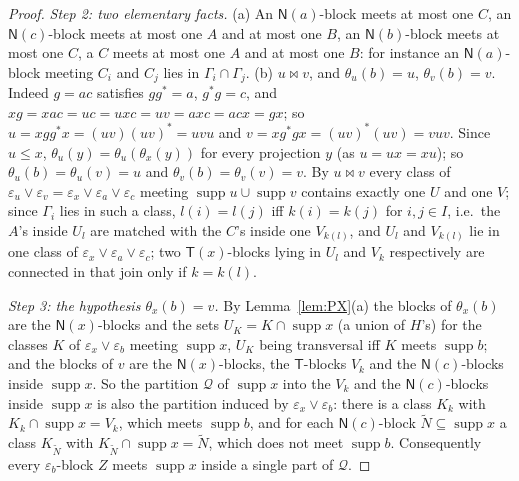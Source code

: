\documentclass[11pt]{amsart}
\theoremstyle{definition}
\newcommand{\supp}{\operatorname{supp}}
\newcommand{\T}{\mathsf{T}}
\newcommand{\N}{\mathsf{N}}
\newcommand{\mt}{\bowtie}   %
\begin{document}
\begin{proof}
\emph{Step 2: two elementary facts.} (a) An $\N(a)$-block meets at most one $C$, an $\N(c)$-block meets at most one $A$ and at most one $B$, an $\N(b)$-block meets at most one $C$, a $C$ meets at most one $A$ and at most one $B$: for instance an $\N(a)$-block meeting $C_i$ and $C_j$ lies in $\Gamma_i\cap\Gamma_j$. (b) $u\mt v$, and $\theta_u(b)=u$, $\theta_v(b)=v$. Indeed $g=ac$ satisfies $gg^*=a$, $g^*g=c$, and $xg=xac=uc=uxc=uv=axc=acx=gx$; so $u=xgg^*x=(uv)(uv)^*=uvu$ and $v=xg^*gx=(uv)^*(uv)=vuv$. Since $u\le x$, $\theta_u(y)=\theta_u(\theta_x(y))$ for every projection $y$ (as $u=ux=xu$); so $\theta_u(b)=\theta_u(v)=u$ and $\theta_v(b)=\theta_v(v)=v$. By $u\mt v$ every class of $\varepsilon_u\vee\varepsilon_v=\varepsilon_x\vee\varepsilon_a\vee\varepsilon_c$ meeting $\supp u\cup\supp v$ contains exactly one $U$ and one $V$; since $\Gamma_i$ lies in such a class, $l(i)=l(j)$ iff $k(i)=k(j)$ for $i,j\in I$, i.e.\ the $A$'s inside $U_l$ are matched with the $C$'s inside one $V_{k(l)}$, and $U_l$ and $V_{k(l)}$ lie in one class of $\varepsilon_x\vee\varepsilon_a\vee\varepsilon_c$; two $\T(x)$-blocks lying in $U_l$ and $V_k$ respectively are connected in that join only if $k=k(l)$.

\emph{Step 3: the hypothesis $\theta_x(b)=v$.} By Lemma~\ref{lem:PX}(a) the blocks of $\theta_x(b)$ are the $\N(x)$-blocks and the sets $U_K=K\cap\supp x$ (a union of $H$'s) for the classes $K$ of $\varepsilon_x\vee\varepsilon_b$ meeting $\supp x$, $U_K$ being transversal iff $K$ meets $\supp b$; and the blocks of $v$ are the $\N(x)$-blocks, the $\T$-blocks $V_k$ and the $\N(c)$-blocks inside $\supp x$. So the partition $\mathcal Q$ of $\supp x$ into the $V_k$ and the $\N(c)$-blocks inside $\supp x$ is also the partition induced by $\varepsilon_x\vee\varepsilon_b$: there is a class $K_k$ with $K_k\cap\supp x=V_k$, which meets $\supp b$, and for each $\N(c)$-block $\tilde N\subseteq\supp x$ a class $K_{\tilde N}$ with $K_{\tilde N}\cap\supp x=\tilde N$, which does not meet $\supp b$. Consequently every $\varepsilon_b$-block $Z$ meets $\supp x$ inside a single part of $\mathcal Q$.


\end{proof}
\end{document}
